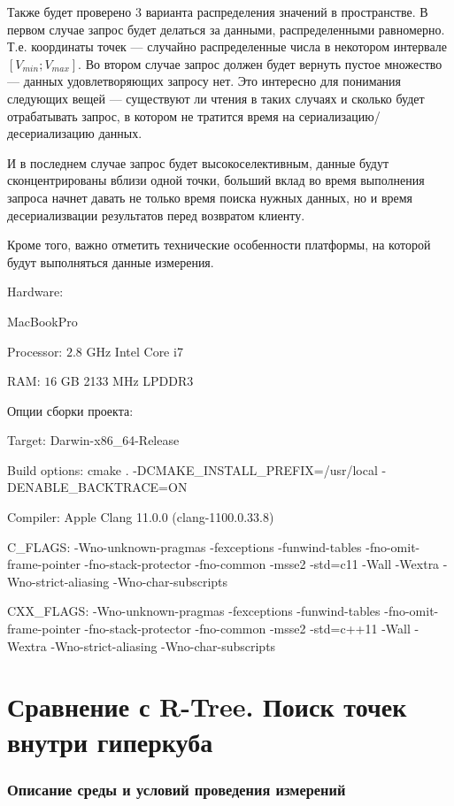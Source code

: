 Также будет проверено 3 варианта распределения значений в пространстве.
В первом случае запрос будет делаться за данными, распределенными равномерно.
Т.е. координаты точек --- случайно распределенные числа в некотором интервале $[V_{min}; V_{max}]$.
Во втором случае запрос должен будет вернуть пустое множество --- данных удовлетворяющих запросу нет. Это интересно для понимания следующих вещей --- существуют ли чтения в таких случаях и сколько будет отрабатывать запрос,
в котором не тратится время на сериализацию/десериализацию данных.

И в последнем случае запрос будет высокоселективным,
данные будут сконцентрированы вблизи одной точки,
больший вклад во время выполнения запроса начнет давать не только время поиска нужных данных,
но и время десериализвации результатов перед возвратом клиенту.

Кроме того, важно отметить технические особенности платформы,
на которой будут выполняться данные измерения.

Hardware:

MacBookPro

Processor: $2.8$ GHz Intel Core i7

RAM: $16$ GB 2133 MHz LPDDR3

Опции сборки проекта:

Target: Darwin-x86\_64-Release

Build options: cmake . -DCMAKE\_INSTALL\_PREFIX=/usr/local -DENABLE\_BACKTRACE=ON

Compiler: Apple Clang 11.0.0 (clang-1100.0.33.8)

C\_FLAGS: -Wno-unknown-pragmas -fexceptions -funwind-tables -fno-omit-frame-pointer -fno-stack-protector -fno-common -msse2 -std=c11 -Wall -Wextra -Wno-strict-aliasing -Wno-char-subscripts

CXX\_FLAGS: -Wno-unknown-pragmas -fexceptions -funwind-tables -fno-omit-frame-pointer -fno-stack-protector -fno-common -msse2 -std=c++11 -Wall -Wextra -Wno-strict-aliasing -Wno-char-subscripts

\section{Сравнение с R-Tree. Поиск точек внутри гиперкуба}

\subsubsection{Описание среды и условий проведения измерений}

